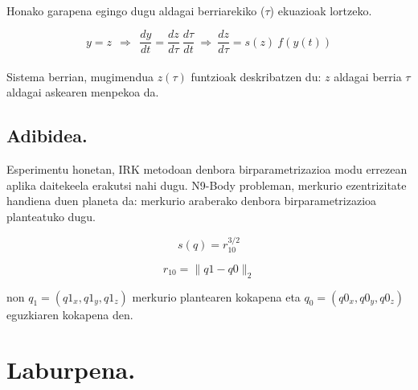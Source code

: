 \paragraph*{} Honako garapena egingo dugu aldagai berriarekiko ($\tau$) ekuazioak lortzeko.

\begin{equation*}
y=z \ \ \Rightarrow \ \ \frac{dy}{dt}=\frac{dz}{d \tau} \ \frac{d \tau}{dt} \ \Rightarrow \ \frac{dz}{d \tau}= s(z) \ f(y(t)) 
\end{equation*}

\paragraph*{} Sistema berrian, mugimendua $z(\tau)$ funtzioak deskribatzen du: $z$ aldagai berria $\tau$ aldagai askearen menpekoa da. 

\subsection{Adibidea.}

Esperimentu honetan, IRK metodoan denbora birparametrizazioa modu errezean aplika daitekeela erakutsi nahi dugu. N9-Body probleman, merkurio ezentrizitate handiena duen planeta da: merkurio araberako denbora birparametrizazioa planteatuko dugu.

\begin{equation}
s(q)=r_{10}^{3/2}
\end{equation}

\begin{equation}
r_{10}=\|q1-q0\|_2
\end{equation}

non $q_1=(q1_{x},q1_{y},q1_{z})$ merkurio plantearen kokapena eta $q_0=(q0_{x},q0_{y},q0_{z})$ eguzkiaren kokapena den.

\section{Laburpena.}